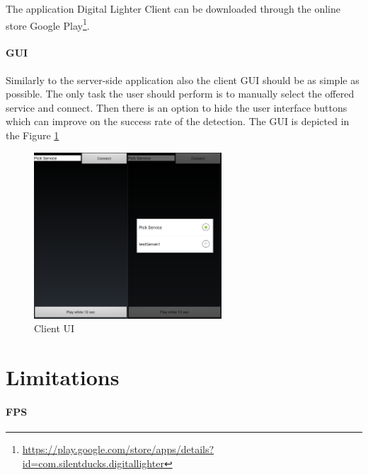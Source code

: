 The application Digital Lighter Client can be downloaded through the online store Google Play\footnote{\url{https://play.google.com/store/apps/details?id=com.silentducks.digitallighter}}.

\paragraph{GUI}
Similarly to the server-side application also the client GUI should be as simple as possible. The only task the user should perform is to manually select the offered service and connect. Then there is an option to hide the user interface buttons which can improve on the success rate of the detection. The GUI is depicted in the Figure \ref{fig:Client_UI}

\begin{figure}[H]
	\centering
		\includegraphics[width=7cm]{conclusion/user_ui.png}
	\caption{Client UI}
	\label{fig:Client_UI}
\end{figure}




\section{Limitations}


\paragraph{FPS}

